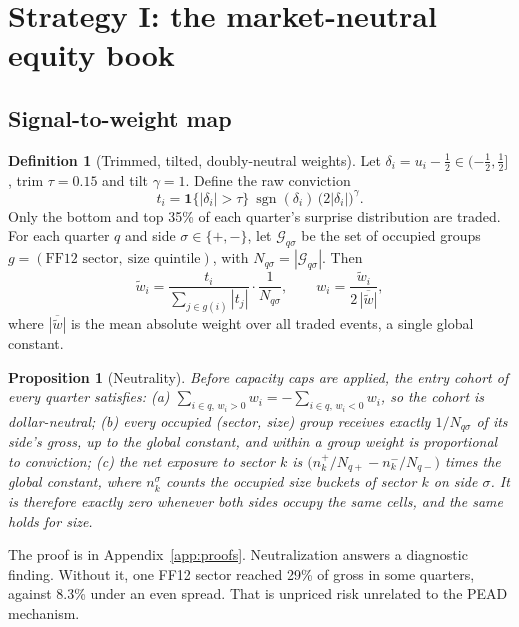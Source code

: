 \documentclass[11pt]{article}
\newtheorem{proposition}{Proposition}
\theoremstyle{definition}
\newtheorem{definition}{Definition}
\newcommand{\sgn}{\operatorname{sgn}}
\newcommand{\1}{\mathbf{1}}
\begin{document}
\section{Strategy I: the market-neutral equity book}\label{sec:equity}

\subsection{Signal-to-weight map}

\begin{definition}[Trimmed, tilted, doubly-neutral weights]\label{def:weights}
Let $\delta_i=u_i-\tfrac12\in(-\tfrac12,\tfrac12]$, trim $\tau=0.15$ and tilt $\gamma=1$.
Define the raw conviction
\[
  t_i=\1\{|\delta_i|>\tau\}\ \sgn(\delta_i)\,\big(2|\delta_i|\big)^{\gamma}.
\]
Only the bottom and top 35\% of each quarter's surprise distribution are traded. For each
quarter $q$ and side $\sigma\in\{+,-\}$, let $\mathcal{G}_{q\sigma}$ be the set of occupied
groups $g=(\text{FF12 sector},\ \text{size quintile})$, with $N_{q\sigma}=|\mathcal{G}_{q\sigma}|$. Then
\begin{equation}
  \tilde w_i=\frac{t_i}{\sum_{j\in g(i)}|t_j|}\cdot\frac{1}{N_{q\sigma}},\qquad
  w_i=\frac{\tilde w_i}{2\,\overline{|\tilde w|}},
  \label{eq:weights}
\end{equation}
where $\overline{|\tilde w|}$ is the mean absolute weight over all traded events, a single
global constant.
\end{definition}

\begin{proposition}[Neutrality]\label{prop:neutral}
Before capacity caps are applied, the entry cohort of every quarter satisfies:
(a) $\sum_{i\in q,\,w_i>0}w_i=-\sum_{i\in q,\,w_i<0}w_i$, so the cohort is dollar-neutral;
(b) every occupied (sector, size) group receives exactly $1/N_{q\sigma}$ of its side's gross,
up to the global constant, and within a group weight is proportional to conviction;
(c) the net exposure to sector $k$ is $\big(n^{+}_{k}/N_{q+}-n^{-}_{k}/N_{q-}\big)$ times the
global constant, where $n^{\sigma}_{k}$ counts the occupied size buckets of sector $k$ on side
$\sigma$. It is therefore exactly zero whenever both sides occupy the same cells, and the
same holds for size.
\end{proposition}
\noindent The proof is in Appendix~\ref{app:proofs}. Neutralization answers a diagnostic
finding. Without it, one FF12 sector reached 29\% of gross in some quarters, against 8.3\%
under an even spread. That is unpriced risk unrelated to the PEAD mechanism.
\end{document}
